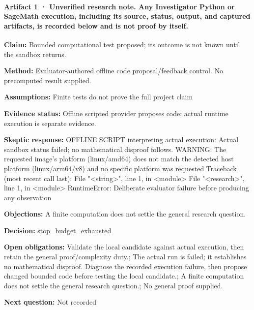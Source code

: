 \documentclass[11pt]{article}
\begin{document}
\paragraph{Artifact 1 · Unverified research note. Any Investigator Python or SageMath execution, including its source, status, output, and captured artifacts, is recorded below and is not proof by itself.}
\textbf{Claim:} Bounded computational test proposed; its outcome is not known until the sandbox returns.\par
\textbf{Method:} Evaluator-authored offline code proposal/feedback control. No precomputed result supplied.\par
\textbf{Assumptions:} Finite tests do not prove the full project claim\par
\textbf{Evidence status:} Offline scripted provider proposes code; actual runtime execution is separate evidence.\par
\textbf{Skeptic response:} OFFLINE SCRIPT interpreting actual execution: Actual sandbox status failed; no mathematical disproof follows. WARNING: The requested image's platform (linux/amd64) does not match the detected host platform (linux/arm64/v8) and no specific platform was requested
Traceback (most recent call last):
  File "\textless{}string\textgreater{}", line 1, in \textless{}module\textgreater{}
  File "\textless{}research\textgreater{}", line 1, in \textless{}module\textgreater{}
RuntimeError: Deliberate evaluator failure before producing any observation\par
\textbf{Objections:} A finite computation does not settle the general research question.\par
\textbf{Decision:} stop\_budget\_exhausted\par
\textbf{Open obligations:} Validate the local candidate against actual execution, then retain the general proof/complexity duty.; The actual run is failed; it establishes no mathematical disproof. Diagnose the recorded execution failure, then propose changed bounded code before testing the local candidate.; A finite computation does not settle the general research question.; No general proof supplied.\par
\textbf{Next question:} Not recorded\par
\end{document}

